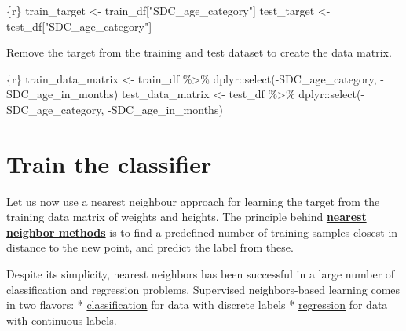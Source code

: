 \documentclass[
  letterpaper,
  DIV=11,
  numbers=noendperiod,
  oneside]{scrreprt}
\newenvironment{Shaded}{\begin{snugshade}}{\end{snugshade}}
\newcommand{\FunctionTok}[1]{\textcolor[rgb]{0.28,0.35,0.67}{#1}}
\newcommand{\InformationTok}[1]{\textcolor[rgb]{0.37,0.37,0.37}{#1}}
\newcommand{\NormalTok}[1]{\textcolor[rgb]{0.00,0.23,0.31}{#1}}
\newcommand{\OtherTok}[1]{\textcolor[rgb]{0.00,0.23,0.31}{#1}}
\newcommand{\SpecialCharTok}[1]{\textcolor[rgb]{0.37,0.37,0.37}{#1}}
\newcommand{\StringTok}[1]{\textcolor[rgb]{0.13,0.47,0.30}{#1}}
\begin{document}
\begin{Shaded}
\begin{Highlighting}[]
\InformationTok{\textasciigrave{}\textasciigrave{}\textasciigrave{}\{r\}}
\NormalTok{train\_target }\OtherTok{\textless{}{-}}\NormalTok{ train\_df[}\StringTok{"SDC\_age\_category"}\NormalTok{] }
\NormalTok{test\_target }\OtherTok{\textless{}{-}}\NormalTok{ test\_df[}\StringTok{"SDC\_age\_category"}\NormalTok{] }
\InformationTok{\textasciigrave{}\textasciigrave{}\textasciigrave{}}
\end{Highlighting}
\end{Shaded}

Remove the target from the training and test dataset to create the data
matrix.

\begin{Shaded}
\begin{Highlighting}[]
\InformationTok{\textasciigrave{}\textasciigrave{}\textasciigrave{}\{r\}}
\NormalTok{train\_data\_matrix }\OtherTok{\textless{}{-}}\NormalTok{ train\_df }\SpecialCharTok{\%\textgreater{}\%}
\NormalTok{  dplyr}\SpecialCharTok{::}\FunctionTok{select}\NormalTok{(}\SpecialCharTok{{-}}\NormalTok{SDC\_age\_category,}
                \SpecialCharTok{{-}}\NormalTok{SDC\_age\_in\_months)}
\NormalTok{test\_data\_matrix }\OtherTok{\textless{}{-}}\NormalTok{ test\_df }\SpecialCharTok{\%\textgreater{}\%}
\NormalTok{  dplyr}\SpecialCharTok{::}\FunctionTok{select}\NormalTok{(}\SpecialCharTok{{-}}\NormalTok{SDC\_age\_category,}
                \SpecialCharTok{{-}}\NormalTok{SDC\_age\_in\_months)}
\InformationTok{\textasciigrave{}\textasciigrave{}\textasciigrave{}}
\end{Highlighting}
\end{Shaded}

\hypertarget{train-the-classifier}{%
\section{Train the classifier}\label{train-the-classifier}}

Let us now use a nearest neighbour approach for learning the target from
the training data matrix of weights and heights. The principle behind
\href{https://scikit-learn.org/stable/modules/classes.html\#module-sklearn.neighbors}{\textbf{nearest
neighbor methods}} is to find a predefined number of training samples
closest in distance to the new point, and predict the label from these.

Despite its simplicity, nearest neighbors has been successful in a large
number of classification and regression problems. Supervised
neighbors-based learning comes in two flavors: *
\href{https://scikit-learn.org/stable/modules/neighbors.html\#classification}{classification}
for data with discrete labels *
\href{https://scikit-learn.org/stable/modules/neighbors.html\#regression}{regression}
for data with continuous labels.
\end{document}
